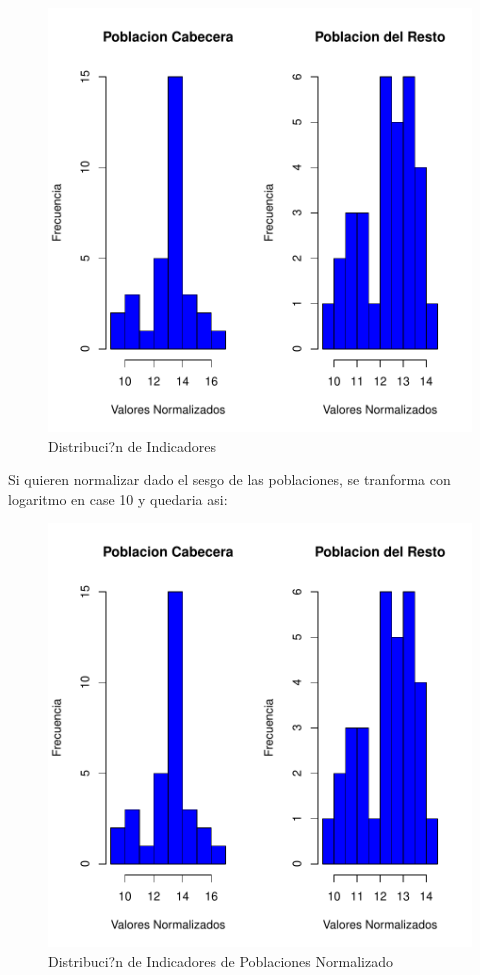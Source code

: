 \documentclass{article}
\begin{document}
\begin{figure}[h]
\centering
\includegraphics{matriz-hist}
\caption{Distribuci?n de Indicadores}
\label{hist}
\end{figure}

Si quieren normalizar dado el sesgo de las poblaciones, se tranforma con logaritmo en case 10 y quedaria asi:

\begin{figure}[h]
\centering
\includegraphics{matriz-hist}
\caption{Distribuci?n de Indicadores de Poblaciones Normalizado}
\label{hist}
\end{figure}



\renewcommand{\refname}{Bibliografia}

\end{document}
